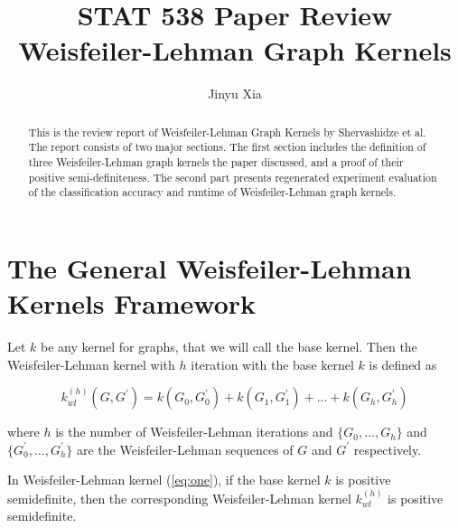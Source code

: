 \documentclass{llncs}
\begin{document}
\title{STAT 538 Paper Review \\ Weisfeiler-Lehman Graph Kernels}
%
%
\author{Jinyu Xia}

\maketitle              %

\begin{abstract}
This is the review report of Weisfeiler-Lehman Graph Kernels by Shervashidze et al. The report consists of two major sections. The first section includes the definition of three Weisfeiler-Lehman graph kernels the paper discussed, and a proof of their positive semi-definiteness. The second part presents regenerated experiment evaluation of the classification accuracy and runtime of Weisfeiler-Lehman graph kernels. 
\end{abstract}

%
\section{The General Weisfeiler-Lehman Kernels Framework}
%

\begin{definition} 

Let $k$ be any kernel for graphs, that we will call the base kernel. Then the Weisfeiler-Lehman kernel with $h$ iteration with the base kernel $k$ is defined as

\begin{equation}
  k_{wl}^{(h)}(G, G^{\prime}) = k(G_0, G_0^{\prime}) + k(G_1, G_1^{\prime}) + ... + k(G_h, G_h^{\prime})
  \label{eq:one}
\end{equation}

where $h$ is the number of Weisfeiler-Lehman iterations and $\{G_0,..., G_h\}$ and $\{G_0^{\prime},..., G_h^{\prime}\}$ are the Weisfeiler-Lehman sequences of $G$ and $G^{\prime}$ respectively. 

\end{definition}

\begin{theorem} In Weisfeiler-Lehman kernel (\ref{eq:one}), if the base kernel $k$ is positive semidefinite, then the corresponding Weisfeiler-Lehman kernel $k_{wl}^{(h)}$ is positive semidefinite. 
\end{theorem}
\end{document}
